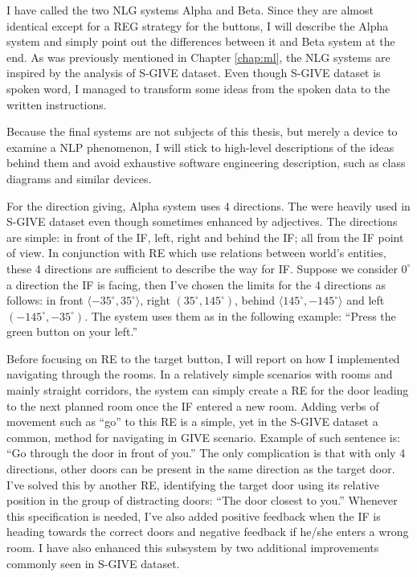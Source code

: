 I have called the two NLG systems Alpha and Beta. Since they are almost identical except for a REG strategy for the buttons, I will describe the Alpha system and simply point out the differences between it and Beta system at the end. As was previously mentioned in Chapter \ref{chap:ml}, the NLG systems are inspired by the analysis of S-GIVE dataset. Even though S-GIVE dataset is spoken word, I managed to transform some ideas from the spoken data to the written instructions.

Because the final systems are not subjects of this thesis, but merely a device to examine a NLP phenomenon, I will stick to high-level descriptions of the ideas behind them and avoid exhaustive software engineering description, such as class diagrams and similar devices.

For the direction giving, Alpha system uses 4 directions. The were heavily used in S-GIVE dataset even though sometimes enhanced by adjectives. The directions are simple: in front of the IF, left, right and behind the IF; all from the IF point of view. In conjunction with RE which use relations between world's entities, these 4 directions are sufficient to describe the way for IF. Suppose we consider $0^{\circ}$ a direction the IF is facing, then I've chosen the limits for the 4 directions as follows: in front $\langle-35^{\circ},35^{\circ}\rangle$, right $(35^{\circ},145^{\circ})$, behind $\langle145^{\circ},-145^{\circ}\rangle$ and left $(-145^{\circ},-35^{\circ})$. The system uses them as in the following example: ``Press the green button on your left.''

Before focusing on RE to the target button, I will report on how I implemented navigating through the rooms. In a relatively simple scenarios with rooms and mainly straight corridors, the system can simply create a RE for the door leading to the next planned room once the IF entered a new room. Adding verbs of movement such as ``go'' to this RE is a simple, yet in the S-GIVE dataset a common, method for navigating in GIVE scenario. Example of such sentence is: ``Go through the door in front of you.'' The only complication is that with only 4 directions, other doors can be present in the same direction as the target door. I've solved this by another RE, identifying the target door using its relative position in the group of distracting doors: ``The door closest to you.'' Whenever this specification is needed, I've also added positive feedback when the IF is heading towards the correct doors and negative feedback if he/she enters a wrong room. I have also enhanced this subsystem by two additional improvements commonly seen in S-GIVE dataset.

